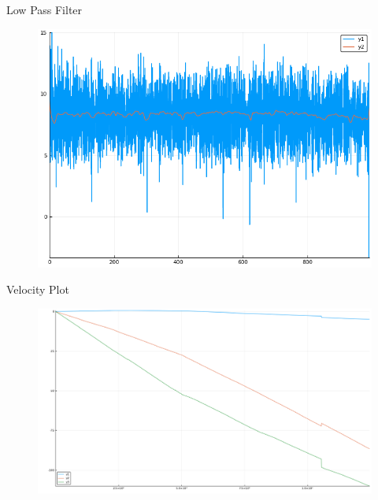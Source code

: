 \documentclass[10pt]{beamer}
\begin{document}
\begin{frame} {Low Pass Filter}
\begin{figure}
\includegraphics[width=\linewidth,height=\textheight,keepaspectratio]{images/accel_z_low}
\end{figure}
\end{frame}

\begin{frame} {Velocity Plot}
\begin{figure}
\includegraphics[width=\linewidth,height=\textheight,keepaspectratio]{images/velocity}
\end{figure}
\end{frame}
\end{document}
